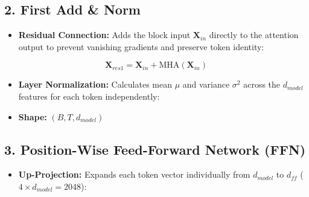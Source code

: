 \documentclass[11pt,a4paper,oneside]{report}
\providecommand{\tightlist}{\setlength{\itemsep}{0pt}\setlength{\parskip}{0pt}}
\begin{document}
\subsection{2. First Add \& Norm}\label{2-first-add--norm}

\begin{itemize}
\tightlist
\item
  \textbf{Residual Connection:} Adds the block input \(\mathbf{X}_{in}\) directly to the attention output to prevent vanishing gradients and preserve token identity:
\end{itemize}

\[\mathbf{X}_{res1} = \mathbf{X}_{in} + \text{MHA}(\mathbf{X}_{in})\]

\begin{itemize}
\tightlist
\item
  \textbf{Layer Normalization:} Calculates mean \(\mu\) and variance \(\sigma^2\) across the \(d_{model}\) features for each token independently:
\end{itemize}

\begin{center}\end{center}

\begin{itemize}
\tightlist
\item
  \textbf{Shape:} \((B, T, d_{model})\)
\end{itemize}

\subsection{3. Position-Wise Feed-Forward Network (FFN)}\label{3-position-wise-feed-forward-network-ffn}

\begin{itemize}
\tightlist
\item
  \textbf{Up-Projection:} Expands each token vector individually from \(d_{model}\) to \(d_{ff}\) (\(4 \times d_{model} = 2048\)):
\end{itemize}

\begin{center}\end{center}
\end{document}
